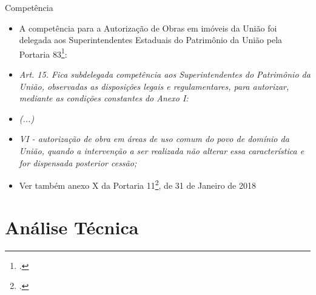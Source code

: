 \documentclass[9pt,ignorenonframetext,]{beamer}
\providecommand{\tightlist}{%
  \setlength{\itemsep}{0pt}\setlength{\parskip}{0pt}}
\begin{document}
\begin{frame}{Competência}

\begin{itemize}[<+->]
\tightlist
\item
  \alert<1>{A competência para a Autorização de Obras em imóveis da União foi
  delegada aos Superintendentes Estaduais do Patrimônio da União pela Portaria
  83\footcite{portaria-83}:}
\end{itemize}

\begin{itemize}[<+->]
\tightlist
\item
  \alert<2>{\emph{Art. 15. Fica subdelegada competência aos Superintendentes do
  Patrimônio da União, observadas as disposições legais e regulamentares, para
  autorizar, mediante as condições constantes do Anexo I:}}
\end{itemize}

\begin{itemize}[<+->]
\tightlist
\item
  \alert<3>{\emph{(...)}}
\end{itemize}

\begin{itemize}[<+->]
\tightlist
\item
  \alert<4>{\emph{VI - autorização de obra em áreas de uso comum do povo de
  domínio da União, quando a intervenção a ser realizada não alterar essa
  característica e for dispensada posterior cessão;}}
\end{itemize}

\begin{itemize}[<+->]
\tightlist
\item
  \alert<5>{Ver também anexo X da Portaria 11\footcite{portaria-11}, de 31 de Janeiro de 2018}
\end{itemize}

\end{frame}

\hypertarget{anuxe1lise-tuxe9cnica}{%
\section{Análise Técnica}\label{anuxe1lise-tuxe9cnica}}
\end{document}
